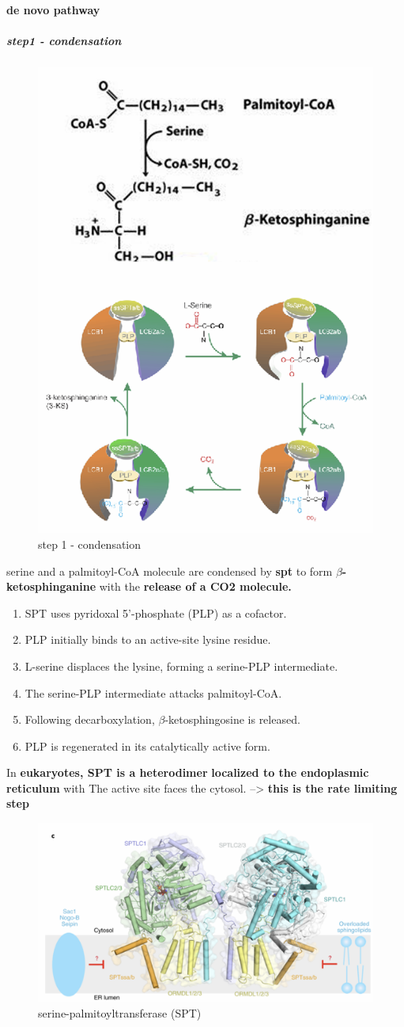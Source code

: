 \documentclass[../main.tex]{subfiles}
\begin{document}
\paragraph{de novo pathway}
\subparagraph{step1 - condensation}
\begin{figure}[h]
    \centering
    \includegraphics[width=0.5\linewidth]{step1S.png}
    \caption{step 1 - condensation}
    \label{fig:enter-label}
\end{figure}
serine and a palmitoyl-CoA 
molecule are condensed by \textbf{\gls{spt}} to form 
\textbf{$\beta$-ketosphinganine} with the \textbf{release of a CO2 molecule. }
\begin{enumerate}
    \item SPT uses pyridoxal 5'-phosphate (PLP) as a cofactor.
    \item PLP initially binds to an active-site lysine residue.
    \item L-serine displaces the lysine, forming a serine-PLP intermediate.
    \item The serine-PLP intermediate attacks palmitoyl-CoA.
    \item Following decarboxylation, $\beta$-ketosphingosine is released.
    \item PLP is regenerated in its catalytically active form.
\end{enumerate}
In \textbf{eukaryotes, SPT is a heterodimer} \textbf{localized to the endoplasmic reticulum} with The active site faces the cytosol.
--> \textbf{this is the rate limiting step }
\begin{figure}[H]
    \centering
    \includegraphics[width=0.5\linewidth]{structureSphingolipidSythase.png}
    \caption{serine-palmitoyltransferase (SPT)}
    \label{fig:enter-label}
\end{figure}
\end{document}
